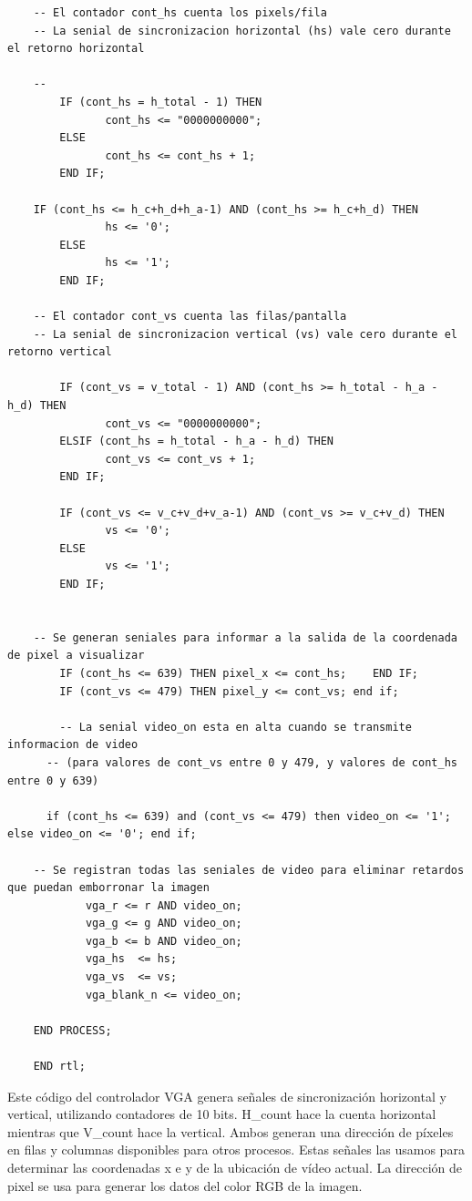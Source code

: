 \begin{lstlisting}
    -- El contador cont_hs cuenta los pixels/fila
    -- La senial de sincronizacion horizontal (hs) vale cero durante el retorno horizontal 
    
    --
        IF (cont_hs = h_total - 1) THEN
               cont_hs <= "0000000000";
        ELSE
               cont_hs <= cont_hs + 1;
        END IF;
    
    IF (cont_hs <= h_c+h_d+h_a-1) AND (cont_hs >= h_c+h_d) THEN
               hs <= '0';
        ELSE
               hs <= '1';
        END IF;
    
    -- El contador cont_vs cuenta las filas/pantalla
    -- La senial de sincronizacion vertical (vs) vale cero durante el retorno vertical
    
        IF (cont_vs = v_total - 1) AND (cont_hs >= h_total - h_a - h_d) THEN
               cont_vs <= "0000000000";
        ELSIF (cont_hs = h_total - h_a - h_d) THEN
               cont_vs <= cont_vs + 1;
        END IF;
    
        IF (cont_vs <= v_c+v_d+v_a-1) AND (cont_vs >= v_c+v_d) THEN
               vs <= '0';
        ELSE
               vs <= '1';
        END IF;
    
    
    -- Se generan seniales para informar a la salida de la coordenada de pixel a visualizar
        IF (cont_hs <= 639) THEN pixel_x <= cont_hs;	END IF;
        IF (cont_vs <= 479) THEN pixel_y <= cont_vs; end if; 
        
        -- La senial video_on esta en alta cuando se transmite informacion de video
      -- (para valores de cont_vs entre 0 y 479, y valores de cont_hs entre 0 y 639)
     
      if (cont_hs <= 639) and (cont_vs <= 479) then video_on <= '1'; else video_on <= '0'; end if;
    
    -- Se registran todas las seniales de video para eliminar retardos que puedan emborronar la imagen
            vga_r <= r AND video_on;
            vga_g <= g AND video_on;
            vga_b <= b AND video_on;
            vga_hs 	<= hs;
            vga_vs 	<= vs;
            vga_blank_n <= video_on;
    
    END PROCESS;
    
    END rtl;
\end{lstlisting}

Este código del controlador VGA genera señales de sincronización horizontal y vertical, utilizando contadores de 10 
bits. H\_count hace la cuenta horizontal mientras que V\_count hace la vertical. Ambos generan una dirección de píxeles 
en filas y columnas disponibles para otros procesos. Estas señales las usamos para determinar las coordenadas x e y de 
la ubicación de vídeo actual. La dirección de pixel se usa para generar los datos del color RGB de la imagen. 

